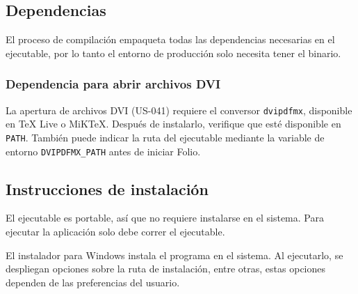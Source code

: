 \subsection{Dependencias}
El proceso de compilación empaqueta todas las dependencias necesarias en el ejecutable, por lo tanto el entorno de producción solo necesita tener el binario.

\subsubsection{Dependencia para abrir archivos DVI}
La apertura de archivos DVI (US-041) requiere el conversor \texttt{dvipdfmx}, disponible en TeX Live o MiKTeX. Después de instalarlo, verifique que esté disponible en \texttt{PATH}. También puede indicar la ruta del ejecutable mediante la variable de entorno \texttt{DVIPDFMX\_PATH} antes de iniciar Folio.

\subsection{Instrucciones de instalación}
El ejecutable es portable, así que no requiere instalarse en el sistema. Para ejecutar la aplicación solo debe correr el ejecutable.

El instalador para Windows instala el programa en el sistema. Al ejecutarlo, se despliegan opciones sobre la ruta de instalación, entre otras, estas opciones dependen de las preferencias del usuario.